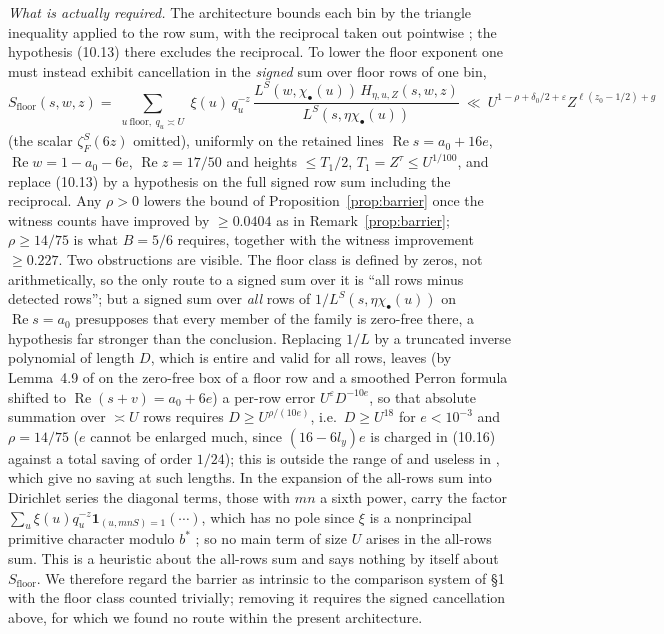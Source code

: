 \documentclass[11pt]{article}
\renewcommand{\Re}{\operatorname{Re}}
\begin{document}
\emph{What is actually required.} The architecture bounds each bin by the triangle inequality applied to the row sum, with the reciprocal taken out pointwise \cite[proof of Lemma~10.4]{Ope26}; the hypothesis (10.13) there excludes the reciprocal. To lower the floor exponent one must instead exhibit cancellation in the \emph{signed} sum over floor rows of one bin,
\[
S_{\mathrm{floor}}(s,w,z)=\sum_{\substack{u\ \text{floor},\ q_u\asymp U}}\xi(u)\,q_u^{-z}\,\frac{L^S(w,\chi_\bullet(u))\,H_{\eta,u,Z}(s,w,z)}{L^S(s,\eta\chi_\bullet(u))}\ \ll\ U^{1-\rho+\delta_0/2+\varepsilon}Z^{\ell(z_0-1/2)+g}
\]
(the scalar $\zeta_F^S(6z)$ omitted), uniformly on the retained lines $\Re s=a_0+16e$, $\Re w=1-a_0-6e$, $\Re z=17/50$ and heights $\le T_1/2$, $T_1=Z^{\tau}\le U^{1/100}$, and replace (10.13) by a hypothesis on the full signed row sum including the reciprocal. Any $\rho>0$ lowers the bound of Proposition~\ref{prop:barrier} once the witness counts have improved by $\ge0.0404$ as in Remark~\ref{prop:barrier}; $\rho\ge14/75$ is what $B=5/6$ requires, together with the witness improvement $\ge0.227$. Two obstructions are visible. The floor class is defined by zeros, not arithmetically, so the only route to a signed sum over it is ``all rows minus detected rows''; but a signed sum over \emph{all} rows of $1/L^S(s,\eta\chi_\bullet(u))$ on $\Re s=a_0$ presupposes that every member of the family is zero-free there, a hypothesis far stronger than the conclusion. Replacing $1/L$ by a truncated inverse polynomial of length $D$, which is entire and valid for all rows, leaves (by Lemma~4.9 of \cite{Ope26} on the zero-free box of a floor row and a smoothed Perron formula shifted to $\Re(s+v)=a_0+6e$) a per-row error $U^{\varepsilon}D^{-10e}$, so that absolute summation over $\asymp U$ rows requires $D\ge U^{\rho/(10e)}$, i.e.\ $D\ge U^{18}$ for $e<10^{-3}$ and $\rho=14/75$ ($e$ cannot be enlarged much, since $(16-6l_y)e$ is charged in (10.16) against a total saving of order $1/24$); this is outside the range of \cite[Lemma~17.1]{Ope26} and useless in \cite[Lemmas~17.6, 9.1]{Ope26}, which give no saving at such lengths. In the expansion of the all-rows sum into Dirichlet series the diagonal terms, those with $mn$ a sixth power, carry the factor $\sum_u\xi(u)q_u^{-z}\mathbf 1_{(u,mnS)=1}(\cdots)$, which has no pole since $\xi$ is a nonprincipal primitive character modulo $b^*$ \cite[\S6.1]{Ope26}; so no main term of size $U$ arises in the all-rows sum. This is a heuristic about the all-rows sum and says nothing by itself about $S_{\mathrm{floor}}$. We therefore regard the barrier as intrinsic to the comparison system of \S1 with the floor class counted trivially; removing it requires the signed cancellation above, for which we found no route within the present architecture.
\end{document}
